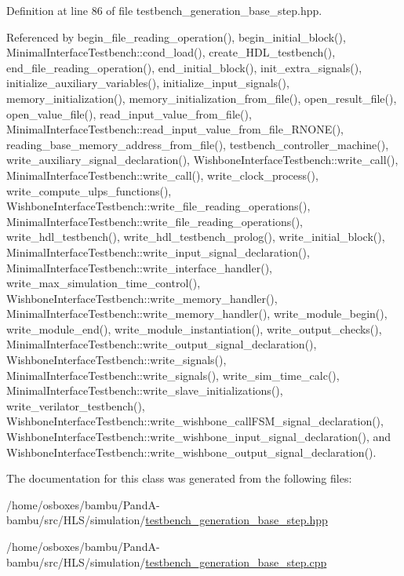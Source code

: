 Definition at line 86 of file testbench\+\_\+generation\+\_\+base\+\_\+step.\+hpp.



Referenced by begin\+\_\+file\+\_\+reading\+\_\+operation(), begin\+\_\+initial\+\_\+block(), Minimal\+Interface\+Testbench\+::cond\+\_\+load(), create\+\_\+\+H\+D\+L\+\_\+testbench(), end\+\_\+file\+\_\+reading\+\_\+operation(), end\+\_\+initial\+\_\+block(), init\+\_\+extra\+\_\+signals(), initialize\+\_\+auxiliary\+\_\+variables(), initialize\+\_\+input\+\_\+signals(), memory\+\_\+initialization(), memory\+\_\+initialization\+\_\+from\+\_\+file(), open\+\_\+result\+\_\+file(), open\+\_\+value\+\_\+file(), read\+\_\+input\+\_\+value\+\_\+from\+\_\+file(), Minimal\+Interface\+Testbench\+::read\+\_\+input\+\_\+value\+\_\+from\+\_\+file\+\_\+\+R\+N\+O\+N\+E(), reading\+\_\+base\+\_\+memory\+\_\+address\+\_\+from\+\_\+file(), testbench\+\_\+controller\+\_\+machine(), write\+\_\+auxiliary\+\_\+signal\+\_\+declaration(), Wishbone\+Interface\+Testbench\+::write\+\_\+call(), Minimal\+Interface\+Testbench\+::write\+\_\+call(), write\+\_\+clock\+\_\+process(), write\+\_\+compute\+\_\+ulps\+\_\+functions(), Wishbone\+Interface\+Testbench\+::write\+\_\+file\+\_\+reading\+\_\+operations(), Minimal\+Interface\+Testbench\+::write\+\_\+file\+\_\+reading\+\_\+operations(), write\+\_\+hdl\+\_\+testbench(), write\+\_\+hdl\+\_\+testbench\+\_\+prolog(), write\+\_\+initial\+\_\+block(), Minimal\+Interface\+Testbench\+::write\+\_\+input\+\_\+signal\+\_\+declaration(), Minimal\+Interface\+Testbench\+::write\+\_\+interface\+\_\+handler(), write\+\_\+max\+\_\+simulation\+\_\+time\+\_\+control(), Wishbone\+Interface\+Testbench\+::write\+\_\+memory\+\_\+handler(), Minimal\+Interface\+Testbench\+::write\+\_\+memory\+\_\+handler(), write\+\_\+module\+\_\+begin(), write\+\_\+module\+\_\+end(), write\+\_\+module\+\_\+instantiation(), write\+\_\+output\+\_\+checks(), Minimal\+Interface\+Testbench\+::write\+\_\+output\+\_\+signal\+\_\+declaration(), Wishbone\+Interface\+Testbench\+::write\+\_\+signals(), Minimal\+Interface\+Testbench\+::write\+\_\+signals(), write\+\_\+sim\+\_\+time\+\_\+calc(), Minimal\+Interface\+Testbench\+::write\+\_\+slave\+\_\+initializations(), write\+\_\+verilator\+\_\+testbench(), Wishbone\+Interface\+Testbench\+::write\+\_\+wishbone\+\_\+call\+F\+S\+M\+\_\+signal\+\_\+declaration(), Wishbone\+Interface\+Testbench\+::write\+\_\+wishbone\+\_\+input\+\_\+signal\+\_\+declaration(), and Wishbone\+Interface\+Testbench\+::write\+\_\+wishbone\+\_\+output\+\_\+signal\+\_\+declaration().



The documentation for this class was generated from the following files\+:\begin{DoxyCompactItemize}
\item 
/home/osboxes/bambu/\+Pand\+A-\/bambu/src/\+H\+L\+S/simulation/\hyperlink{testbench__generation__base__step_8hpp}{testbench\+\_\+generation\+\_\+base\+\_\+step.\+hpp}\item 
/home/osboxes/bambu/\+Pand\+A-\/bambu/src/\+H\+L\+S/simulation/\hyperlink{testbench__generation__base__step_8cpp}{testbench\+\_\+generation\+\_\+base\+\_\+step.\+cpp}\end{DoxyCompactItemize}
